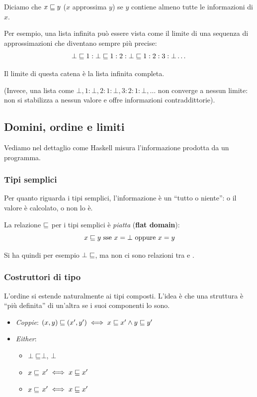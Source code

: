 Diciamo che $x \sqsubseteq y$ ($x$ approssima $y$) se $y$ contiene almeno tutte le informazioni di $x$.

Per esempio, una lista infinita \code{[1..]} può essere vista come il limite di una sequenza di approssimazioni che diventano sempre più precise:
$$\bot \sqsubseteq 1:\bot \sqsubseteq 1:2:\bot \sqsubseteq 1:2:3:\bot \dots $$

Il limite di questa catena è la lista infinita completa.

(Invece, una lista come $\bot, 1 : \bot, 2 : 1: \bot, 3 : 2 : 1 : \bot, \dots$ non converge a nessun limite: non si stabilizza a nessun valore e offre informazioni contraddittorie).

\subsection{Domini, ordine e limiti}
Vediamo nel dettaglio come Haskell misura l'informazione prodotta da un programma.

\subsubsection{Tipi semplici}
Per quanto riguarda i tipi semplici, l'informazione è un ``tutto o niente'': o il valore è calcolato, o non lo è.

La relazione $\sqsubseteq$ per i tipi semplici è \textit{piatta} (\textbf{flat domain}): 
$$x \sqsubseteq y \text{ sse } x = \bot \text{ oppure } x = y$$

Si ha quindi per esempio $\bot \sqsubseteq$, ma non ci sono relazioni tra  e .

\subsubsection{Costruttori di tipo}
L'ordine si estende naturalmente ai tipi composti. L'idea è che una struttura è ``più definita'' di un'altra se i suoi componenti lo sono.

\begin{itemize}
    \item \textit{Coppie}: $(x, y) \sqsubseteq (x', y') \iff x \sqsubseteq x' \land y \sqsubseteq y'$
    \item \textit{Either}: 
        \begin{itemize}
            \item $\bot \sqsubseteq$$\bot$, $\bot$
            \item {}$x \sqsubseteq$  $x' \iff x \sqsubseteq x'$
            \item {}$x \sqsubseteq$  $x' \iff x \sqsubseteq x'$
        \end{itemize}
\end{itemize}

